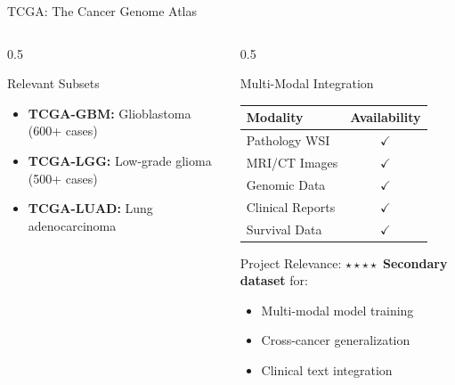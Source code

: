 \documentclass[aspectratio=169]{beamer}
\begin{document}
\begin{frame}{TCGA: The Cancer Genome Atlas}
\begin{columns}
\begin{column}{0.5\textwidth}
            \begin{block}{Relevant Subsets}
                \begin{itemize}
                    \item \textbf{TCGA-GBM:} Glioblastoma (600+ cases)
                    \item \textbf{TCGA-LGG:} Low-grade glioma (500+ cases)
                    \item \textbf{TCGA-LUAD:} Lung adenocarcinoma
                \end{itemize}
            \end{block}
        \end{column}
        \begin{column}{0.5\textwidth}
            \begin{block}{Multi-Modal Integration}
                \begin{center}
                    \begin{tabular}{lc}
                        \toprule
                        \textbf{Modality} & \textbf{Availability} \\
                        \midrule
                        Pathology WSI & $\checkmark$ \\
                        MRI/CT Images & $\checkmark$ \\
                        Genomic Data & $\checkmark$ \\
                        Clinical Reports & $\checkmark$ \\
                        Survival Data & $\checkmark$ \\
                        \bottomrule
                    \end{tabular}
                \end{center}
            \end{block}
            
            \begin{alertblock}{Project Relevance: $\star\star\star\star$}
                \textbf{Secondary dataset} for:
                \begin{itemize}
                    \item Multi-modal model training
                    \item Cross-cancer generalization
                    \item Clinical text integration
                \end{itemize}
            \end{alertblock}
        \end{column}
    \end{columns}
\end{frame}
\end{document}
